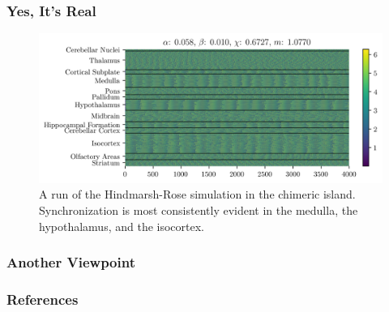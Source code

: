 \documentclass[hyperref={hidelinks}]{beamer}
\begin{document}
\begin{frame}
  \frametitle{Yes, It's Real}
  \begin{figure}[ht]
    \includegraphics[width=\textwidth]{figure/overhead-0_058-0_010}
    \caption[Highly chimeric simulation]{
      A run of the Hindmarsh-Rose simulation in the chimeric island.
      Synchronization is most consistently evident in the medulla, the hypothalamus, and the isocortex.
    }
    \label{fig:overhead_058_010}
  \end{figure}

\end{frame}
\begin{frame}
  \frametitle{Another Viewpoint}
  \centering
\end{frame}

\begin{frame}[allowframebreaks]
  \frametitle{References}
  \tiny \printbibliography
\end{frame}
\end{document}

